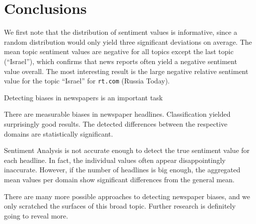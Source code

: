 \documentclass[final]{ieee}
\begin{document}
\section{Conclusions}\label{sec:conclusions}

We first note that the distribution of sentiment values is informative, since a random distribution would only yield three significant deviations on average. The mean topic sentiment values are negative for all topics except the last topic (``Israel''), which confirms that news reports often yield a negative sentiment value overall. The most interesting result is the large negative relative sentiment value for the topic ``Israel'' for \texttt{rt.com} (Russia Today).

Detecting biases in newspapers is an important task

There are measurable biases in newspaper headlines. Classification yielded surprisingly good results. The detected differences between the respective domains are statistically significant.

Sentiment Analysis is not accurate enough to detect the true sentiment value for each headline. In fact, the individual values often appear disappointingly inaccurate. However, if the number of headlines is big enough, the aggregated mean values per domain show significant differences from the general mean.

There are many more possible approaches to detecting newspaper biases, and we only scratched the surfaces of this broad topic. Further research is definitely going to reveal more.

           
\end{document}
